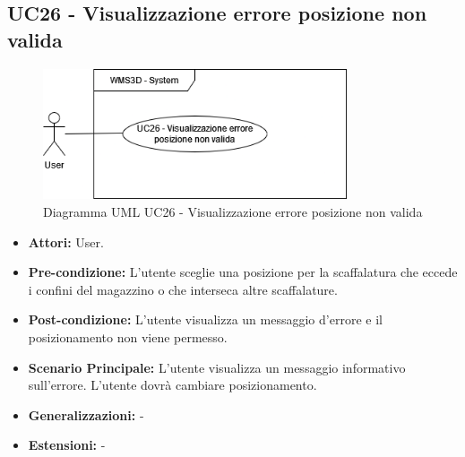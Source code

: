 \subsection{UC26 - Visualizzazione errore posizione non valida}
\begin{figure}[H]
  \centering
  \includegraphics[width=0.8\textwidth]{UC_diagrams_21-27/UC26.drawio.png}
   \caption{Diagramma UML UC26 - Visualizzazione errore posizione non valida}
\end{figure}
\begin{itemize}
    \item \textbf{Attori:} User.
    \item \textbf{Pre-condizione:}  L'utente sceglie una posizione per la scaffalatura che eccede i confini del magazzino o che interseca altre scaffalature.
    \item \textbf{Post-condizione:} L'utente visualizza un messaggio d'errore e il posizionamento non viene permesso.
    \item \textbf{Scenario Principale:} L'utente visualizza un messaggio informativo sull'errore. L'utente dovrà cambiare posizionamento.
    \item \textbf{Generalizzazioni:} -
    \item \textbf{Estensioni:} -
\end{itemize}